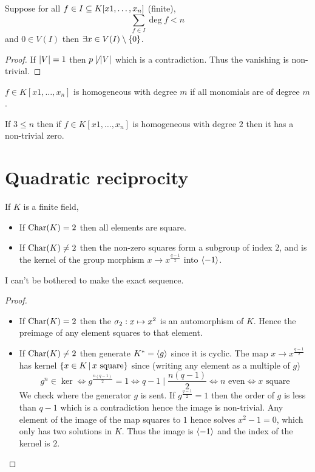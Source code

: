 \begin{cor}
    Suppose for all $f \in I \subseteq K[x1, \dots , x_n]$ (finite), 
    \[\sum_{f \in I} \deg f < n\]
    and $0 \in V(I)$ then $\exists x \in V(I) \setminus \left\{0\right\}$.
\end{cor}
\begin{proof}
    If $\left\vert V \right\vert = 1$ then $p \not \mid \left\vert V \right\vert$ which is a contradiction.
    Thus the vanishing is non-trivial.
\end{proof}

\begin{dfn}[Homogeneous]
    $f \in K[x1, \dots , x_n]$ is homogeneous with degree $m$ 
    if all monomials are of degree $m$.
\end{dfn}

\begin{cor}
    If $3 \le n$ then if $f \in K[x1, \dots , x_n]$ 
    is homogeneous with degree $2$ then it has a non-trivial zero.
\end{cor}

\section{Quadratic reciprocity}
\begin{prop}
    If $K$ is a finite field,
    \begin{itemize}
        \item If $\mathrm{Char}(K) = 2$ then all elements are square.
        \item If $\mathrm{Char}(K) \ne 2$ 
        then the non-zero squares form a subgroup of index $2$,
        and is the kernel of the group morphism 
        $x \to x^{\frac{q-1}{2}}$ into $\langle-1\rangle$.
    \end{itemize}
    I can't be bothered to make the exact sequence.%
\end{prop}
\begin{proof}~
    \begin{itemize}
        \item If $\mathrm{Char}(K) = 2$ then the 
         $\sigma_2 : x \mapsto x^2$
        is an automorphism of $K$. 
        Hence the preimage of any element squares to that element.
        \item If $\mathrm{Char}(K) \ne 2$ then generate $K^* = \langle g\rangle$ 
        since it is cyclic.
        The map $x \to x^{\frac{q-1}{2}}$ 
        has kernel $\left\{x \in K \,|\, x \text{ square}\right\}$ since
        (writing any element as a multiple of $g$)
        \[
            g^n \in \ker \iff g^\frac{n(q-1)}{2} = 1 \iff 
            q - 1 \mid \frac{n(q - 1)}{2} \iff n \text{ even} 
            \iff x \text{ square}
        \]
        We check where the generator $g$ is sent. 
        If $g^{\frac{q - 1}{2}} = 1$ then the order of $g$ 
        is less than $q - 1$ which is a contradiction
        hence the image is non-trivial.
        Any element of the image of the map squares to $1$
        hence solves $x^2 - 1 = 0$,
        which only has two solutions in $K$.
        Thus the image is $\langle-1\rangle$ and the index of the kernel is $2$.
    \end{itemize}
\end{proof}

